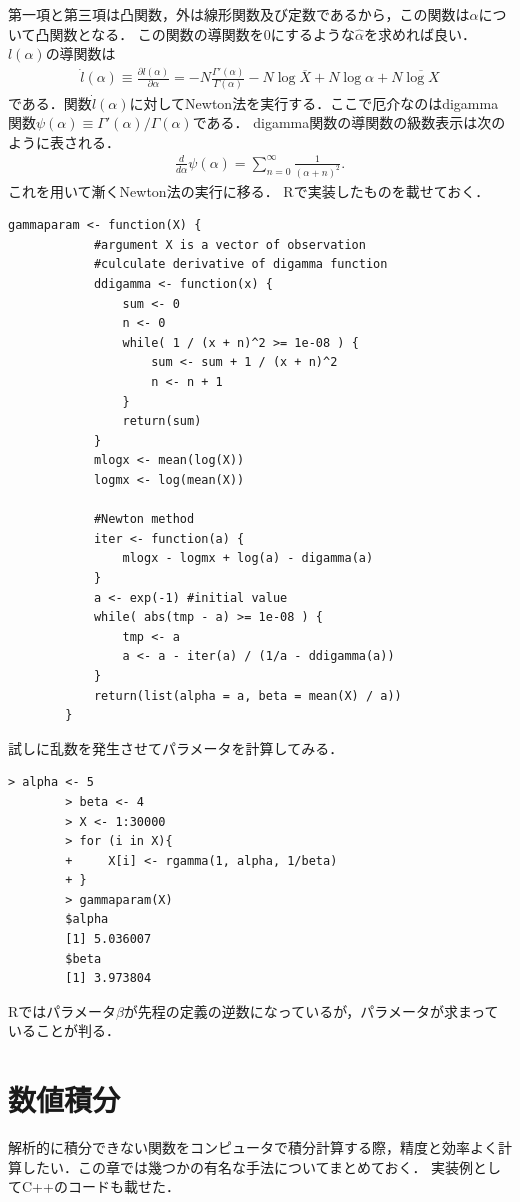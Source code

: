 \documentclass[a4j,papersize,disablejfam,slide,14pt]{jsarticle}
\def\Log#1{\operatorname{log} #1} %
\begin{document}
    第一項と第三項は凸関数，外は線形関数及び定数であるから，この関数は$\alpha$について凸関数となる．
    この関数の導関数を$0$にするような$\hat{\alpha}$を求めれば良い．$l(\alpha)$の導関数は
    \begin{align}
    	\dot{l}(\alpha) \equiv \frac{\partial l(\alpha)}{\partial \alpha} 
        = -N \frac{\Gamma'(\alpha)}{\Gamma(\alpha)} - N \Log{\overline{X}} + N \Log{\alpha} + N \overline{\Log{X}}
    \end{align}
    である．関数$\dot{l}(\alpha)$に対して{\rm Newton}法を実行する．ここで厄介なのは{\rm digamma}関数$\psi(\alpha) \equiv \Gamma'(\alpha)/\Gamma(\alpha)$である．
    {\rm digamma}関数の導関数の級数表示は次のように表される．
    \begin{align}
    	\frac{d}{d \alpha} \psi(\alpha) = \sum_{n=0}^{\infty} \frac{1}{(\alpha + n)^2}.
    \end{align}
    これを用いて漸く{\rm Newton}法の実行に移る．
    {\rm R}で実装したものを載せておく．
    \begin{lstlisting}[style=customR]
    	gammaparam <- function(X) {
        	#argument X is a vector of observation
        	#culculate derivative of digamma function
            ddigamma <- function(x) {
            	sum <- 0
                n <- 0
                while( 1 / (x + n)^2 >= 1e-08 ) {
                	sum <- sum + 1 / (x + n)^2
                    n <- n + 1
                }
                return(sum)
            }
            mlogx <- mean(log(X))
            logmx <- log(mean(X))
            
            #Newton method
            iter <- function(a) {
            	mlogx - logmx + log(a) - digamma(a)
            }
            a <- exp(-1) #initial value
            while( abs(tmp - a) >= 1e-08 ) {
            	tmp <- a
            	a <- a - iter(a) / (1/a - ddigamma(a))
            }
            return(list(alpha = a, beta = mean(X) / a)) 
        }
    \end{lstlisting}
    試しに乱数を発生させてパラメータを計算してみる．
    \begin{lstlisting}[style=customR]
    	> alpha <- 5
		> beta <- 4
		> X <- 1:30000
		> for (i in X){
		+     X[i] <- rgamma(1, alpha, 1/beta)
		+ }
		> gammaparam(X)
		$alpha
		[1] 5.036007
        $beta
        [1] 3.973804
	\end{lstlisting}
    {\rm R}ではパラメータ$\beta$が先程の定義の逆数になっているが，パラメータが求まっていることが判る．

\section{数値積分}
	解析的に積分できない関数をコンピュータで積分計算する際，精度と効率よく計算したい．この章では幾つかの有名な手法についてまとめておく．
    実装例として{\rm C++}のコードも載せた．
    
\end{document}
